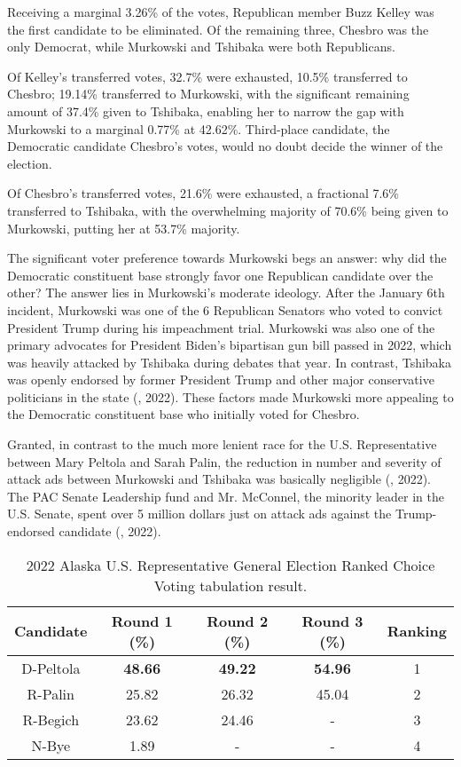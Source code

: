 \documentclass[12pt, a4paper, twoside]{article}
\begin{document}
Receiving a marginal 3.26\% of the votes, Republican member Buzz Kelley was the first candidate to be eliminated. Of the remaining three, Chesbro was the only Democrat, while Murkowski and Tshibaka were both Republicans. 

Of Kelley’s transferred votes, 32.7\% were exhausted, 10.5\% transferred to Chesbro; 19.14\% transferred to Murkowski, with the significant remaining amount of 37.4\% given to Tshibaka, enabling her to narrow the gap with Murkowski to a marginal 0.77\% at 42.62\%. Third-place candidate, the Democratic candidate Chesbro’s votes, would no doubt decide the winner of the election. 

Of Chesbro’s transferred votes, 21.6\% were exhausted, a fractional 7.6\% transferred to Tshibaka, with the overwhelming majority of 70.6\% being given to Murkowski, putting her at 53.7\% majority. 

The significant voter preference towards Murkowski begs an answer: why did the Democratic constituent base strongly favor one Republican candidate over the other? The answer lies in Murkowski’s moderate ideology. After the January 6th incident, Murkowski was one of the 6 Republican Senators who voted to convict President Trump during his impeachment trial. Murkowski was also one of the primary advocates for President Biden’s bipartisan gun bill passed in 2022, which was heavily attacked by Tshibaka during debates that year. In contrast, Tshibaka was openly endorsed by former President Trump and other major conservative politicians in the state (\cite{gomez2022}, 2022). These factors made Murkowski more appealing to the Democratic constituent base who initially voted for Chesbro.

Granted, in contrast to the much more lenient race for the U.S. Representative between Mary Peltola and Sarah Palin, the reduction in number and severity of attack ads between Murkowski and Tshibaka was basically negligible (\cite{shivaram2022}, 2022). The PAC Senate Leadership fund and Mr. McConnel, the minority leader in the U.S. Senate, spent over 5 million dollars just on attack ads against the Trump-endorsed candidate (\cite{ulloa2022}, 2022). 

\begin{table}[h]
\centering
\begin{tabular}{|c|c|c|c|c|}
\hline
Candidate & Round 1 (\%) & Round 2 (\%) & Round 3 (\%) & Ranking \\ \hline
D-Peltola & \textbf{48.66} & \textbf{49.22} & \textbf{54.96} & 1 \\ \hline
R-Palin & 25.82 & 26.32 & 45.04 & 2 \\ \hline
R-Begich & 23.62 & 24.46 & - & 3 \\ \hline
N-Bye & 1.89 & - & - & 4 \\ \hline
\end{tabular}
\caption{2022 Alaska U.S. Representative General Election Ranked Choice Voting tabulation result.}
\label{tab:5}
\end{table}
\end{document}

